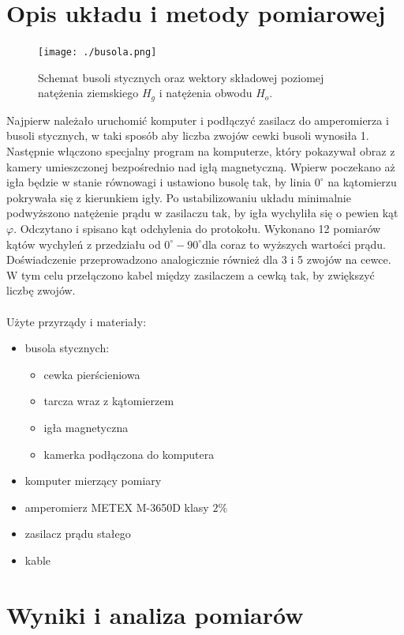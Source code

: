 \documentclass[a4paper,10pt]{article}
\begin{document}
\section{Opis układu i metody pomiarowej}
\begin{figure}[H]
\centering
  \texttt{[image: ./busola.png]}
  \caption{Schemat busoli stycznych oraz wektory składowej poziomej natężenia ziemskiego $H_g$ i natężenia obwodu $H_o$.}
  \label{}
\end{figure}
Najpierw należało uruchomić komputer i podłączyć zasilacz do amperomierza i busoli stycznych, w taki sposób aby liczba zwojów cewki busoli wynosiła 1. Następnie włączono specjalny program na komputerze, który pokazywał obraz z kamery umieszczonej bezpośrednio nad igłą magnetyczną. Wpierw poczekano aż igła będzie w stanie równowagi i ustawiono busolę tak, by linia $0^\circ$ na kątomierzu pokrywała się z kierunkiem igły. Po ustabilizowaniu układu minimalnie podwyższono natężenie prądu w zasilaczu tak, by igła wychyliła się o pewien kąt $\varphi$. Odczytano i spisano kąt odchylenia do protokołu. Wykonano 12 pomiarów kątów wychyleń z przedziału od $0^\circ - 90^\circ$dla coraz to wyższych wartości prądu. Doświadczenie przeprowadzono analogicznie również dla 3 i 5 zwojów na cewce. W tym celu przełączono kabel między zasilaczem a cewką tak, by zwiększyć liczbę zwojów. 
\\
\\Użyte przyrządy i materiały:
\begin{itemize}
  \item busola stycznych:
    \begin{itemize}
      \item cewka pierścieniowa
      \item tarcza wraz z kątomierzem
      \item igła magnetyczna
      \item kamerka podłączona do komputera
    \end{itemize}
  \item komputer mierzący pomiary
  \item amperomierz METEX M-3650D klasy $2\%$
  \item zasilacz prądu stałego
  \item kable
\end{itemize}

\section{Wyniki i analiza pomiarów}
\end{document}
